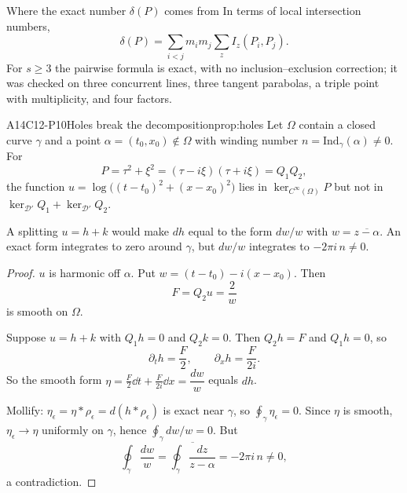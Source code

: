 \begin{aside}{Where the exact number $\delta(P)$ comes from}
In terms of local intersection numbers,
\[
\delta(P)=\sum_{i<j}m_im_j\sum_zI_z(P_i,P_j).
\]
For $s\ge3$ the pairwise formula is exact, with no inclusion--exclusion correction; it was checked on three concurrent lines, three tangent parabolas, a triple point with multiplicity, and four factors.
\end{aside}

\begin{dimcard}{A14}{C12-P10}{Holes break the decomposition}{\proved}{prop:holes}
Let $\Omega$ contain a closed curve $\gamma$ and a point $\alpha=(t_0,x_0)\notin\Omega$ with winding number $n=\mathrm{Ind}_\gamma(\alpha)\ne0$. For
\[
P=\tau^2+\xi^2=(\tau-i\xi)(\tau+i\xi)=Q_1Q_2,
\]
the function $u=\log\big((t-t_0)^2+(x-x_0)^2\big)$ lies in $\ker_{C^\infty(\Omega)}P$ but not in $\ker_{\mathcal D'}Q_1+\ker_{\mathcal D'}Q_2$.
\end{dimcard}

\begin{proofidea}
A splitting $u=h+k$ would make $dh$ equal to the form $dw/w$ with $w=\overline{z-\alpha}$. An exact form integrates to zero around $\gamma$, but $dw/w$ integrates to $-2\pi i\,n\ne0$.
\end{proofidea}

\begin{proof}
$u$ is harmonic off $\alpha$. Put $w=(t-t_0)-i(x-x_0)$. Then
\[
F=Q_2u=\frac{2}{w}
\]
is smooth on $\Omega$.

Suppose $u=h+k$ with $Q_1h=0$ and $Q_2k=0$. Then $Q_2h=F$ and $Q_1h=0$, so
\[
\partial_th=\frac F2,\qquad \partial_xh=\frac F{2i}.
\]
So the smooth form $\eta=\tfrac F2\dd t+\tfrac F{2i}\dd x=\dfrac{dw}{w}$ equals $dh$.

Mollify: $\eta_\epsilon=\eta*\rho_\epsilon=d(h*\rho_\epsilon)$ is exact near $\gamma$, so $\oint_\gamma\eta_\epsilon=0$. Since $\eta$ is smooth, $\eta_\epsilon\to\eta$ uniformly on $\gamma$, hence $\oint_\gamma dw/w=0$. But
\[
\oint_\gamma\frac{dw}{w}=\overline{\oint_\gamma\frac{dz}{z-\alpha}}=-2\pi i\,n\ne0,
\]
a contradiction.

\end{proof}


